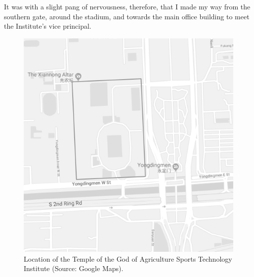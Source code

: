 \begin{CJK}{UTF8}{gbsn}
It was with a slight pang of nervousness, therefore, that I made my way from the southern gate, around the stadium, and towards the main office building to meet the Institute's vice principal.

\begin{figure}[htbp]
  \centering
  \includegraphics[scale =.5]{images/beijingXNT.png}
  \caption{Location of the Temple of the God of Agriculture Sports Technology Institute  (Source: Google Maps).}
  \label{fig:beijingXNT}
\end{figure}



\end{CJK}
